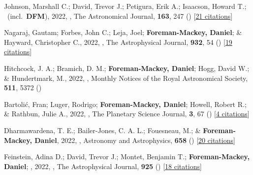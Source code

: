 \item[{\color{numcolor}\scriptsize80}] Johnson, Marshall C.; David, Trevor J.; Petigura, Erik A.; Isaacson, Howard T.; \etal\ (incl.\ \textbf{DFM}), 2022, , The Astronomical Journal, \textbf{163}, 247 () [\href{https://ui.adsabs.harvard.edu/abs/2022AJ....163..247J}{21 citations}]

\item[{\color{numcolor}\scriptsize79}] Nagaraj, Gautam; Forbes, John C.; Leja, Joel; \textbf{Foreman-Mackey, Daniel}; \& Hayward, Christopher C., 2022, , The Astrophysical Journal, \textbf{932}, 54 () [\href{https://ui.adsabs.harvard.edu/abs/2022ApJ...932...54N}{19 citations}]

\item[{\color{numcolor}\scriptsize78}] Hitchcock, J. A.; Bramich, D. M.; \textbf{Foreman-Mackey, Daniel}; Hogg, David W.; \& Hundertmark, M., 2022, , Monthly Notices of the Royal Astronomical Society, \textbf{511}, 5372 ()

\item[{\color{numcolor}\scriptsize77}] Bartoli{\'c}, Fran; Luger, Rodrigo; \textbf{Foreman-Mackey, Daniel}; Howell, Robert R.; \& Rathbun, Julie A., 2022, , The Planetary Science Journal, \textbf{3}, 67 () [\href{https://ui.adsabs.harvard.edu/abs/2022PSJ.....3...67B}{4 citations}]

\item[{\color{numcolor}\scriptsize76}] Dharmawardena, T. E.; Bailer-Jones, C. A. L.; Fouesneau, M.; \& \textbf{Foreman-Mackey, Daniel}, 2022, , Astronomy and Astrophysics, \textbf{658} () [\href{https://ui.adsabs.harvard.edu/abs/2022A&A...658A.166D}{20 citations}]

\item[{\color{numcolor}\scriptsize75}] Feinstein, Adina D.; David, Trevor J.; Montet, Benjamin T.; \textbf{Foreman-Mackey, Daniel}; \etal, 2022, , The Astrophysical Journal, \textbf{925} () [\href{https://ui.adsabs.harvard.edu/abs/2022ApJ...925L...2F}{18 citations}]

